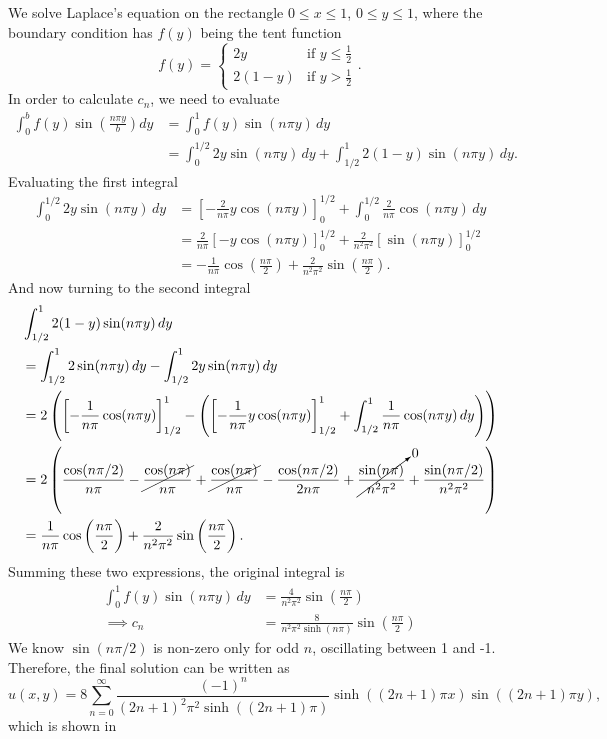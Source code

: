 \begin{enumerate}
	\begin{eg}\label{eg:laplacerect}
		We solve Laplace's equation on the rectangle $0 \leq x \leq 1$, $0 \leq y \leq 1$, where the boundary condition has $f(y)$ being the tent function
		\[
		f(y) = \begin{cases} 2y & \text{if } y \leq \frac12 \\ 2(1-y) & \text{if } y>\frac12 \end{cases}.
		\]
		In order to calculate $c_n$, we need to evaluate
		\begin{align*}
			\int_0^b f(y)\sin\left(\frac{n\pi y}{b}\right)dy &= \int_0^1 f(y)\sin(n\pi y) \,dy \\
			&= \int_0^{1/2} 2y\sin(n\pi y) \,dy + \int_{1/2}^1 2(1-y)\sin(n\pi y) \,dy.
		\end{align*}
		Evaluating the first integral
		\begin{align*}
			\int_0^{1/2} 2y\sin(n\pi y) \,dy &= \left[ -\frac{2}{n\pi}y\cos(n\pi y)\right]_0^{1/2} + \int_0^{1/2} \frac{2}{n\pi} \cos(n\pi y) \,dy \\
			&= \frac{2}{n\pi}\left[-y\cos(n\pi y)\right]_0^{1/2} + \frac{2}{n^2\pi^2}\left[\sin(n\pi y)\right]_0^{1/2} \\
			&= -\frac{1}{n\pi} \cos\left(\frac{n\pi}{2}\right) + \frac{2}{n^2\pi^2} \sin\left(\frac{n\pi}{2}\right).
		\end{align*}
		And now turning to the second integral
		\begin{align*}
			&\int_{1/2}^1 2(1-y)\sin(n\pi y) \,dy \\
			&= \int_{1/2}^1 2\sin(n\pi y) \,dy - \int_{1/2}^1 2y\sin(n\pi y) \,dy \\
			&= 2\left(\left[-\frac{1}{n\pi}\cos(n\pi y)\right]_{1/2}^1 - \left( \left[-\frac{1}{n\pi}y\cos(n\pi y)\right]_{1/2}^1 + \int_{1/2}^1 \frac{1}{n\pi}\cos(n\pi y) \,dy \right)\right) \\
			&= 2\left(\frac{\cos(n\pi/2)}{n\pi} -\cancel{\frac{\cos(n\pi)}{n\pi}} + \cancel{\frac{\cos(n\pi)}{n\pi}} - \frac{\cos(n\pi/2)}{2n\pi} + \cancelto{0}{\frac{\sin(n\pi)}{n^2\pi^2}} + \frac{\sin(n\pi/2)}{n^2\pi^2}\right) \\
			&= \frac{1}{n\pi} \cos\left(\frac{n\pi}{2}\right) + \frac{2}{n^2\pi^2} \sin\left(\frac{n\pi}{2}\right).
		\end{align*}
		Summing these two expressions, the original integral is
		\begin{align*}
			\int_0^1 f(y)\sin(n\pi y) \,dy &= \frac{4}{n^2\pi^2} \sin\left(\frac{n\pi}{2}\right) \\
			\implies c_n &= \frac{8}{n^2\pi^2\sinh(n\pi)} \sin\left(\frac{n\pi}{2}\right)
		\end{align*}
		We know $\sin(n\pi/2)$ is non-zero only for odd $n$, oscillating between 1 and -1. Therefore, the final solution can be written as 
		\[
		u(x,y) = 8\sum_{n=0}^{\infty} \frac{(-1)^n}{(2n+1)^2\pi^2 \sinh\left((2n+1)\pi\right)} \sinh\left((2n+1)\pi x\right) \sin\left((2n+1)\pi y\right),
		\] 
		which is shown in 
	\end{eg}
	

\end{enumerate}
